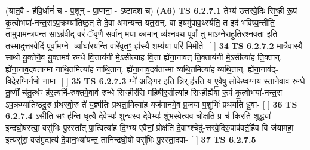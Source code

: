 \documentclass[17pt]{extarticle}
\begin{document}
                  \newline
                      (यात॒वै - ह॑वि॒र्धानं॑ च - प॒शून् - पा॒प्मना॒ - ऽष्टाद॑श च)  \textbf{(A6)} \newline \newline
                                        \textbf{ TS 6.2.7.1} \newline
                  तेभ्य॑ उत्तरवे॒दिः सिꣳ॒॒॒ही रू॒पं कृ॒त्वोभया॑-नन्त॒राऽप॒क्रम्या॑तिष्ठ॒त् ते दे॒वा अ॑मन्यन्त यत॒रान्. वा इ॒यमु॑पाव॒र्थ्स्यति॒ त इ॒दं भ॑विष्य॒न्तीति॒ तामुपा॑मन्त्रयन्त॒ साऽब्र॑वी॒द् वरं॑ ॅवृणै॒ सर्वा॒न् मया॒ कामा॒न् व्य॑श्नवथ॒ पूर्वां॒ तु मा॒ऽग्नेराहु॑तिरश्नवता॒ इति॒ तस्मा॑दुत्तरवे॒दिं पूर्वा॑म॒ग्ने- र्व्याघा॑रयन्ति॒ वारे॑वृतꣳ॒॒ ह्य॑स्यै॒ शम्य॑या॒ परि॑ मिमीते॒- [  ] \textbf{  34} \newline
                  \newline
                                \textbf{ TS 6.2.7.2} \newline
                  मात्रै॒वास्यै॒ साथो॑ यु॒क्तेनै॒व यु॒क्तमव॑ रुन्धे वि॒त्ताय॑नी मे॒ऽसीत्या॑ह वि॒त्ता ह्ये॑ना॒नाव॑त् ति॒क्ताय॑नी मे॒ऽसीत्या॑ह ति॒क्तान्. ह्ये॑ना॒नाव॒दव॑तान्मा नाथि॒तमित्या॑ह नाथि॒तान्. ह्ये॑ना॒नाव॒दव॑तान्मा व्यथि॒तमित्या॑ह व्यथि॒तान्. ह्ये॑ना॒नाव॑द्-वि॒देर॒ग्निर्नभो॒ नामा- [  ] \textbf{  35} \newline
                  \newline
                                \textbf{ TS 6.2.7.3} \newline
                  ग्ने॑ अङ्गिर॒ इति॒ त्रिर्.ह॑रति॒ य ए॒वैषु लो॒केष्व॒ग्नय॒-स्ताने॒वाव॑ रुन्धे तू॒ष्णीं च॑तु॒र्त्थꣳ ह॑र॒त्यनि॑-रुक्तमे॒वाव॑ रुन्धे सिꣳ॒॒हीर॑सि महि॒षीर॒सीत्या॑ह सिꣳ॒॒हीर्ह्ये॑षा रू॒पं कृ॒त्वोभया॑-नन्त॒रा ऽप॒क्रम्याति॑ष्ठदु॒रु प्र॑थस्वो॒रु ते॑ य॒ज्ञ्प॑तिः प्रथता॒मित्या॑ह॒ यज॑मानमे॒व प्र॒जया॑ प॒शुभिः॑ प्रथयति ध्रु॒वा- [  ] \textbf{  36} \newline
                  \newline
                                \textbf{ TS 6.2.7.4} \newline
                  ऽसीति॒ सꣳ ह॑न्ति॒ धृत्यै॑ दे॒वेभ्यः॑ शुन्धस्व दे॒वेभ्यः॑ शुंभ॒स्वेत्यव॑ चो॒क्षति॒ प्र च॑ किरति॒ शुद्ध्या॑ इन्द्रघो॒षस्त्वा॒ वसु॑भिः पु॒रस्ता᳚त् पा॒त्वित्या॑ह दि॒ग्भ्य ए॒वैनां॒ प्रोक्ष॑ति दे॒वाꣳश्चेदु॑-त्तरवे॒दिरु॒पाव॑वर्ती॒हैव वि ज॑यामहा॒ इत्यसु॑रा॒ वज्र॑मु॒द्यत्य॑ दे॒वान॒भ्या॑यन्त॒ तानि॑न्द्रघो॒षो वसु॑भिः पु॒रस्ता॒दपा॑- [  ] \textbf{  37} \newline
                  \newline
                                \textbf{ TS 6.2.7.5} \newline
\end{document}
